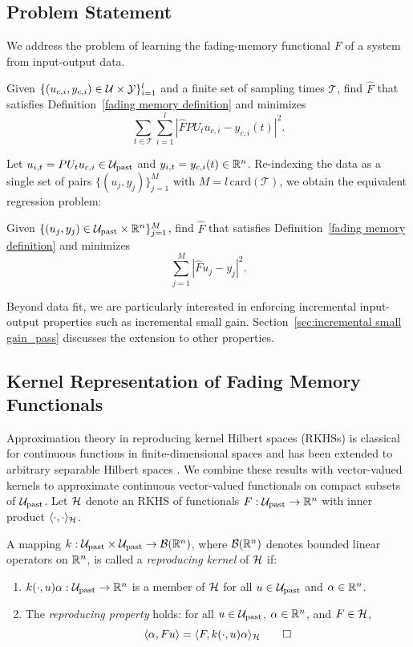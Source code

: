 \subsection{Problem Statement}
We address the problem of learning the fading-memory functional $F$ of a system from input-output data.
\begin{objective}
Given $\{(u_{c,i},y_{c,i})\in {\cal U} \times {\cal Y} \}_{i=1}^l$ and a finite set of sampling times $\mathcal{T}$, find $\hat{F}$ that satisfies Definition~\ref{fading memory definition} and minimizes
$$
\sum_{t\in\mathcal{T}}\sum_{i=1}^{l}\left|\hat{F}PU_{t}u_{c,i}-y_{c,i}(t)\right|^2.
$$
\end{objective}
Let $u_{i,t}=PU_{t}u_{c,i}\in{\cal U}_\text{past}$ and $y_{i,t}=y_{c,i}(t)\in\mathbb{R}^n$. Re-indexing the data as a single set of pairs $\{(u_j,y_j)\}_{j=1}^{M}$ with $M=l\,\text{card}(\mathcal{T})$, we obtain the equivalent regression problem:
\begin{objective}
Given $\{(u_{j},y_{j})\in {\cal U}_{\text{past}} \times \mathbb{R}^n \}_{j=1}^{M}$, find $\hat{F}$ that satisfies Definition~\ref{fading memory definition} and minimizes
$$
\sum_{j=1}^{M}\left|\hat{F}u_{j}-y_{j}\right|^2.
$$
\end{objective}
Beyond data fit, we are particularly interested in enforcing incremental input-output properties such as incremental small gain. Section~\ref{sec:incremental small gain_pass} discusses the extension to other properties.

\subsection{Kernel Representation of Fading Memory Functionals}\label{sec:kernel_approx}
Approximation theory in reproducing kernel Hilbert spaces (RKHSs) is classical for continuous functions in finite-dimensional spaces \autocite{paulsen_introduction_2016} and has been extended to arbitrary separable Hilbert spaces \autocite{christmann_universal_2010}. We combine these results with vector-valued kernels \autocite{micchelli_learning_2005} to approximate continuous vector-valued functionals on compact subsets of ${\cal U}_\text{past}$. Let ${\cal H}$ denote an RKHS of functionals $F:{\cal U}_\text{past}\to\mathbb{R}^n$ with inner product $\langle\cdot,\cdot\rangle_{\cal H}$.

\begin{definition}[RKHS]
A mapping $k:{\cal U}_\text{past} \times {\cal U}_\text{past} \to {\cal B}(\mathbb{R}^n)$, where ${\cal B}(\mathbb{R}^n)$ denotes bounded linear operators on $\mathbb{R}^n$, is called a \textit{reproducing kernel} of ${\cal H}$ if:
\begin{enumerate}
    \item $k(\cdot,u)\alpha:{\cal U}_\text{past}\to\mathbb{R}^n$ is a member of ${\cal H}$ for all $u\in {\cal U}_\text{past}$ and $\alpha \in \mathbb{R}^n$.
    \item The \textit{reproducing property} holds: for all $u\in{\cal U}_\text{past}$, $\alpha \in \mathbb{R}^n$, and $F\in {\cal H}$,
    $$\langle \alpha,Fu\rangle=\langle F,k(\cdot,u)\alpha\rangle_{{\cal H}} \qedhere$$
\end{enumerate}
\end{definition}

